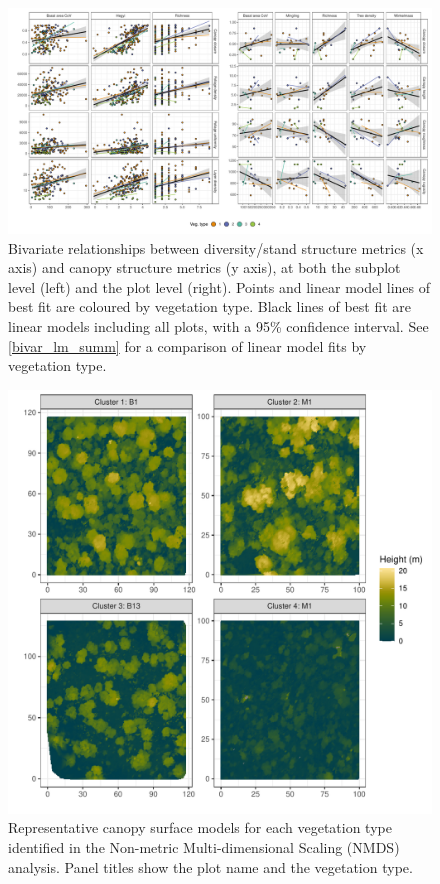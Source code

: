 \documentclass[11pt,a4paper]{article}
\begin{document}
\begin{landscape}
\begin{figure}
	\includegraphics[width=\linewidth]{bivar}
	\caption[Bivariate plots comparing diversity, stand structure and canopy structure]{Bivariate relationships between diversity/stand structure metrics (x axis) and canopy structure metrics (y axis), at both the subplot level (left) and the plot level (right). Points and linear model lines of best fit are coloured by vegetation type. Black lines of best fit are linear models including all plots, with a 95\% confidence interval. See \autoref{bivar_lm_summ} for a comparison of linear model fits by vegetation type.}
	\label{subplot_canopy_bivar}
\end{figure}
\end{landscape}

\begin{figure}
	\includegraphics[width=\linewidth]{veg_type_tile}
	\caption{Representative canopy surface models for each vegetation type identified in the Non-metric Multi-dimensional Scaling (NMDS) analysis. Panel titles show the plot name and the vegetation type.}
	\label{veg_type_tile}
\end{figure}
\end{document}

